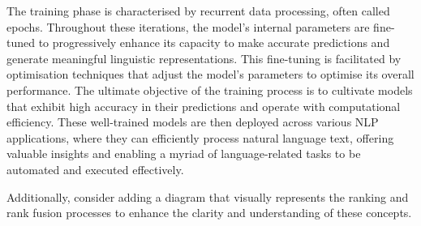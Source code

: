 The training phase is characterised by recurrent data processing, often called epochs. Throughout these iterations, the model's internal parameters are fine-tuned to progressively enhance its capacity to make accurate predictions and generate meaningful linguistic representations. This fine-tuning is facilitated by optimisation techniques that adjust the model's parameters to optimise its overall performance. The ultimate objective of the training process is to cultivate models that exhibit high accuracy in their predictions and operate with computational efficiency. These well-trained models are then deployed across various NLP applications, where they can efficiently process natural language text, offering valuable insights and enabling a myriad of language-related tasks to be automated and executed effectively.

Additionally, consider adding a diagram that visually represents the ranking and rank fusion processes to enhance the clarity and understanding of these concepts.
